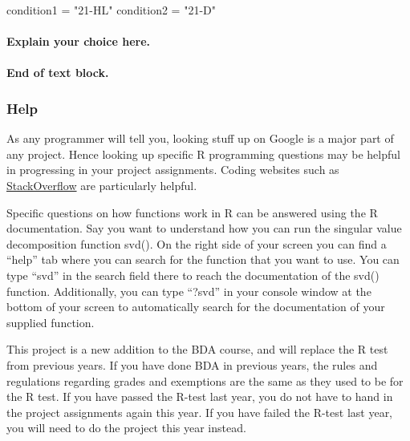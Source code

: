 \documentclass[
]{article}
\newenvironment{Shaded}{\begin{snugshade}}{\end{snugshade}}
\newcommand{\NormalTok}[1]{#1}
\newcommand{\OtherTok}[1]{\textcolor[rgb]{0.56,0.35,0.01}{#1}}
\newcommand{\StringTok}[1]{\textcolor[rgb]{0.31,0.60,0.02}{#1}}
\begin{document}
\begin{Shaded}
\begin{Highlighting}[]
\NormalTok{condition1 }\OtherTok{=} \StringTok{"21{-}HL"}
\NormalTok{condition2 }\OtherTok{=} \StringTok{"21{-}D"}
\end{Highlighting}
\end{Shaded}

\hypertarget{explain-your-choice-here.}{%
\paragraph{\texorpdfstring{Explain your choice here.\\
}{Explain your choice here. }}\label{explain-your-choice-here.}}

\hypertarget{end-of-text-block.}{%
\paragraph{End of text block.}\label{end-of-text-block.}}

\hypertarget{help}{%
\subsubsection{Help}\label{help}}

As any programmer will tell you, looking stuff up on Google is a major
part of any project. Hence looking up specific R programming questions
may be helpful in progressing in your project assignments. Coding
websites such as \href{https://stackoverflow.com/}{StackOverflow} are
particularly helpful.

Specific questions on how functions work in R can be answered using the
R documentation. Say you want to understand how you can run the singular
value decomposition function svd(). On the right side of your screen you
can find a ``help'' tab where you can search for the function that you
want to use. You can type ``svd'' in the search field there to reach the
documentation of the svd() function. Additionally, you can type ``?svd''
in your console window at the bottom of your screen to automatically
search for the documentation of your supplied function.

This project is a new addition to the BDA course, and will replace the R
test from previous years. If you have done BDA in previous years, the
rules and regulations regarding grades and exemptions are the same as
they used to be for the R test. If you have passed the R-test last year,
you do not have to hand in the project assignments again this year. If
you have failed the R-test last year, you will need to do the project
this year instead.
\end{document}

